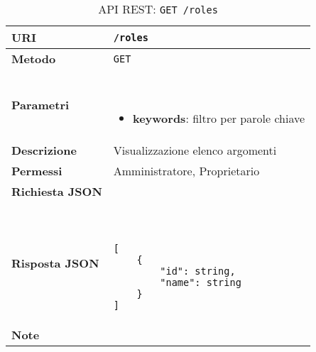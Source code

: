         \begin{table}[H]
            \begin{center}
                \begin{tabular}{p{} p{}}
                    \toprule
                    \textbf{URI} & \texttt{/roles} \\ \midrule
                    \textbf{Metodo} & \texttt{GET} \\ \midrule
                    \textbf{Parametri} & \
                        \begin{itemize}
                            \item \textbf{keywords}: filtro per parole chiave
                        \end{itemize}
                        \\ \midrule
                    \textbf{Descrizione} & Visualizzazione elenco argomenti \\ \midrule
                    \textbf{Permessi} & Amministratore, Proprietario  \\ \midrule
                    \textbf{Richiesta JSON} & \\ \midrule
                    \textbf{Risposta JSON} & \
                        \begin{lstlisting}[basicstyle={\ttfamily}]
[
    {
        "id": string,
        "name": string
    }
]
                        \end{lstlisting}
                        \\ \midrule
                    \textbf{Note} & \\
                    \bottomrule
                \end{tabular}
                \caption{API REST: \texttt{GET /roles}}
            \end{center}
        \end{table}
